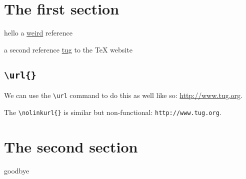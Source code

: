\documentclass{article}
\begin{document}
\section{The first section}
hello a 
\href{http://www-fourier.ujf-grenoble.fr:80/cgi-bin/zbfr/ZB/math-fr.html?AU=Taylor,+R&format=complete&type=html&maxdocs=10}{weird}
reference

a second reference 
\href{http://www.tug.org/}{tug}
to the \TeX{} website 

\subsection{\verb#\url{}#}
We can use the \verb#\url# command to do this as
well like so: \url{http://www.tug.org}.  

The \verb#\nolinkurl{}# is similar but non-functional: \nolinkurl{http://www.tug.org}. 

\section{The second section}
\hypertarget{TestTarget}{goodbye}
\end{document}
